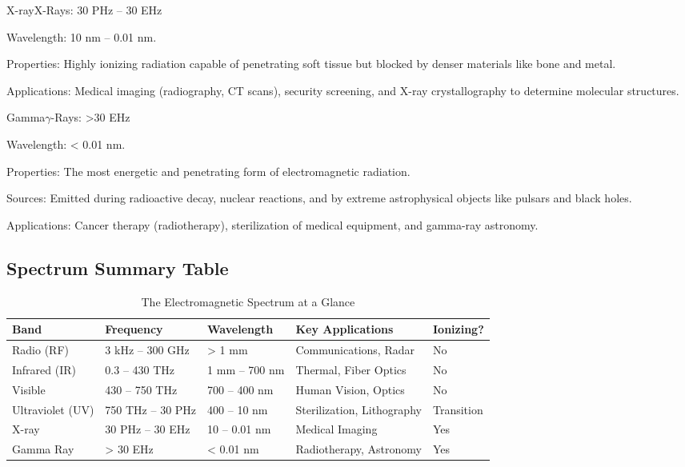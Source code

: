 \begin{spectrumband}{X-ray}{X-Rays: 30 PHz -- 30 EHz}
    \item[Wavelength:] 10 nm -- 0.01 nm.
    \item[Properties:] Highly ionizing radiation capable of penetrating soft tissue but blocked by denser materials like bone and metal.
    \item[Applications:] Medical imaging (radiography, CT scans), security screening, and X-ray crystallography to determine molecular structures.
\end{spectrumband}

\begin{spectrumband}{Gamma}{$\gamma$-Rays: >30 EHz}
    \item[Wavelength:] < 0.01 nm.
    \item[Properties:] The most energetic and penetrating form of electromagnetic radiation.
    \item[Sources:] Emitted during radioactive decay, nuclear reactions, and by extreme astrophysical objects like pulsars and black holes.
    \item[Applications:] Cancer therapy (radiotherapy), sterilization of medical equipment, and gamma-ray astronomy.
\end{spectrumband}

\subsection{Spectrum Summary Table}
\begin{table}[H]
    \centering
    \caption{The Electromagnetic Spectrum at a Glance}
    \label{tab:spectrum-summary}
    \begin{tabular}{@{}lllll@{}}
        \toprule
        \tableheaderfont Band & \tableheaderfont Frequency & \tableheaderfont Wavelength & \tableheaderfont Key Applications & \tableheaderfont Ionizing? \\
        \midrule
        Radio (RF) & 3 kHz -- 300 GHz & > 1 mm & Communications, Radar & No \\
        Infrared (IR) & 0.3 -- 430 THz & 1 mm -- 700 nm & Thermal, Fiber Optics & No \\
        Visible & 430 -- 750 THz & 700 -- 400 nm & Human Vision, Optics & No \\
        Ultraviolet (UV) & 750 THz -- 30 PHz & 400 -- 10 nm & Sterilization, Lithography & Transition \\
        X-ray & 30 PHz -- 30 EHz & 10 -- 0.01 nm & Medical Imaging & Yes \\
        Gamma Ray & > 30 EHz & < 0.01 nm & Radiotherapy, Astronomy & Yes \\
        \bottomrule
    \end{tabular}
\end{table}

